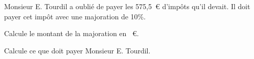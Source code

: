 Monsieur E. Tourdil a oublié de payer les 575,5~\textgreek{\euro}
d'impôts qu'il devait. Il doit payer cet impôt avec une majoration de
10\%.
\begin{myenumerate}
\item Calcule le montant de la majoration en ~\textgreek{\euro}.
\item Calcule ce que doit payer Monsieur E. Tourdil.
\end{myenumerate}
